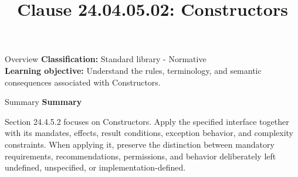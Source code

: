 \documentclass[10pt,letterpaper]{article}
\title{Clause 24.04.05.02: Constructors}
\author{}
\date{}
\begin{document}
\maketitle
\begin{CornellOverviewBox}{Overview}
\textbf{Classification:} Standard library - Normative\\[2pt]
\textbf{Learning objective:} Understand the rules, terminology, and semantic consequences associated with Constructors.
\end{CornellOverviewBox}\begin{CornellSummaryBox}{Summary}
{\sffamily\bfseries\color{Accent} Summary}\par\vspace{3pt}Section 24.4.5.2 focuses on Constructors. Apply the specified interface together with its mandates, effects, result conditions, exception behavior, and complexity constraints. When applying it, preserve the distinction between mandatory requirements, recommendations, permissions, and behavior deliberately left undefined, unspecified, or implementation-defined.
\end{CornellSummaryBox}
\end{document}
